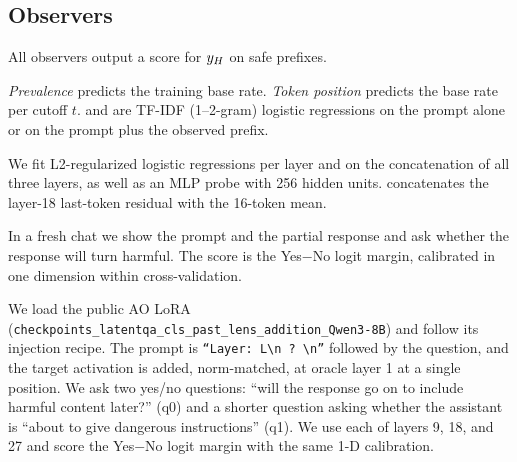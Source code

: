 \subsection{Observers}
\label{sec:observers}
All observers output a score for $y_{H}$ on safe prefixes.

\emph{Prevalence} predicts the training base rate. \emph{Token position} predicts the base rate per cutoff $t$. \textprompt and \textprefix are TF-IDF (1--2-gram) logistic regressions on the prompt alone or on the prompt plus the observed prefix.

We fit L2-regularized logistic regressions per layer and on the concatenation of all three layers, as well as an MLP probe with 256 hidden units. \histprobe concatenates the layer-18 last-token residual with the 16-token mean.

In a fresh chat we show \qwen the prompt and the partial response and ask whether the response will turn harmful. The score is the Yes$-$No logit margin, calibrated in one dimension within cross-validation.

We load the public \qwen AO LoRA (\texttt{checkpoints\_latentqa\_cls\_past\_lens\_addition\_Qwen3-8B}) and follow its injection recipe. The prompt is \texttt{``Layer: L\textbackslash n ? \textbackslash n''} followed by the question, and the target activation is added, norm-matched, at oracle layer 1 at a single position. We ask two yes/no questions: ``will the response go on to include harmful content later?'' (q0) and a shorter question asking whether the assistant is ``about to give dangerous instructions'' (q1). We use each of layers 9, 18, and 27 and score the Yes$-$No logit margin with the same 1-D calibration.

